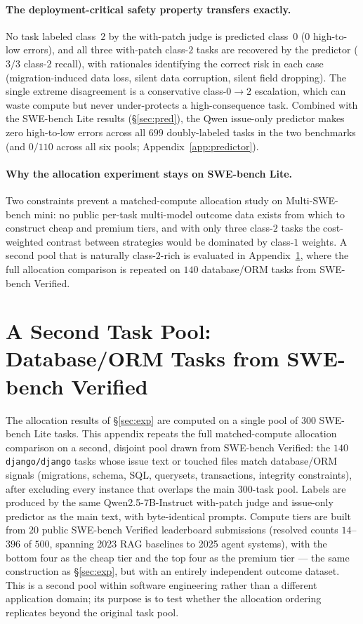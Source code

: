 \documentclass{article}
\begin{document}
\paragraph{The deployment-critical safety property transfers
exactly.} No task labeled class~$2$ by the with-patch judge is
predicted class~$0$ ($0$ high-to-low errors), and all three
with-patch class-$2$ tasks are recovered by the predictor ($3/3$
class-$2$ recall), with rationales identifying the correct risk in
each case (migration-induced data loss, silent data corruption,
silent field dropping). The single extreme disagreement is a
conservative class-$0{\to}2$ escalation, which can waste compute but
never under-protects a high-consequence task. Combined with the
SWE-bench Lite results (\S\ref{sec:pred}), the Qwen issue-only
predictor makes zero high-to-low errors across all $699$
doubly-labeled tasks in the two benchmarks (and $0/110$ across all
six pools; Appendix~\ref{app:predictor}).

\paragraph{Why the allocation experiment stays on SWE-bench Lite.}
Two constraints prevent a matched-compute allocation study on
Multi-SWE-bench mini: no public per-task multi-model outcome data
exists from which to construct cheap and premium tiers, and with
only three class-$2$ tasks the cost-weighted contrast between
strategies would be dominated by class-$1$ weights. A second pool
that is naturally class-$2$-rich is evaluated in
Appendix~\ref{app:seconddomain}, where the full allocation
comparison is repeated on $140$ database/ORM tasks from SWE-bench
Verified.

\section{A Second Task Pool: Database/ORM Tasks from SWE-bench Verified}
\label{app:seconddomain}

The allocation results of \S\ref{sec:exp} are computed on a single
pool of $300$ SWE-bench Lite tasks. This appendix repeats the full
matched-compute allocation comparison on a second, disjoint pool
drawn from SWE-bench Verified: the $140$ \texttt{django/django}
tasks whose issue text or touched files match database/ORM signals
(migrations, schema, SQL, querysets, transactions, integrity
constraints), after excluding every instance that overlaps the main
$300$-task pool. Labels are produced by the same
Qwen2.5-7B-Instruct with-patch judge and issue-only predictor as
the main text, with byte-identical prompts. Compute tiers are built
from $20$ public SWE-bench Verified leaderboard submissions
(resolved counts $14$--$396$ of $500$, spanning 2023 RAG baselines
to 2025 agent systems), with the bottom four as the cheap tier and
the top four as the premium tier --- the same construction as
\S\ref{sec:exp}, but with an entirely independent outcome dataset.
This is a second pool within software engineering rather than a
different application domain; its purpose is to test whether the
allocation ordering replicates beyond the original task pool.
\end{document}
